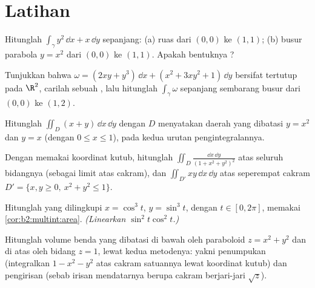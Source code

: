 \section{Latihan}

\begin{exercise}[$\star$]\label{exo:b2:multint:1}
Hitunglah $\int_\gamma y^2\,\dd x + x\,\dd y$ sepanjang: (a) ruas
dari $(0,0)$ ke $(1,1)$; (b) busur parabola $y = x^2$ dari
$(0,0)$ ke $(1,1)$. Apakah bentuknya ?
\end{exercise}

\begin{exercise}[$\star$]\label{exo:b2:multint:2}
Tunjukkan bahwa $\omega = (2xy + y^3)\,\dd x + (x^2 + 3xy^2 + 1)\,\dd y$
bersifat tertutup pada $\R^2$, carilah sebuah , lalu hitunglah
$\int_\gamma\omega$ sepanjang sembarang busur dari $(0, 0)$ ke $(1, 2)$.
\end{exercise}

\begin{exercise}[$\star$]\label{exo:b2:multint:3}
Hitunglah $\iint_D (x + y)\,\dd x\,\dd y$ dengan $D$ menyatakan daerah
yang dibatasi $y = x^2$ dan $y = x$ (dengan $0 \leq x \leq 1$), pada kedua
urutan pengintegralannya.
\end{exercise}

\begin{exercise}[$\star\star$]\label{exo:b2:multint:4}
Dengan memakai koordinat kutub, hitunglah $\iint_D \frac{\dd x\,\dd y}{(1 +
x^2 + y^2)^2}$ atas seluruh bidangnya (sebagai limit atas cakram), dan
$\iint_{D'} xy\,\dd x\,\dd y$ atas seperempat cakram $D' = \{x, y
\geq 0,\ x^2 + y^2 \leq 1\}$.
\end{exercise}

\begin{exercise}[$\star\star$]\label{exo:b2:multint:5}
Hitunglah  yang dilingkupi  $x = \cos^3 t$, $y =
\sin^3 t$, dengan $t \in [0, 2\pi]$, memakai
\cref{cor:b2:multint:area}. \emph{(Linearkan $\sin^2 t\cos^2 t$.)}
\end{exercise}

\begin{exercise}[$\star\star$]\label{exo:b2:multint:6}
Hitunglah volume benda yang dibatasi di bawah oleh paraboloid $z
= x^2 + y^2$ dan di atas oleh bidang $z = 1$, lewat kedua metodenya:
yakni penumpukan (integralkan $1 - x^2 - y^2$ atas cakram satuannya lewat
koordinat kutub) dan pengirisan (sebab irisan mendatarnya berupa cakram berjari-jari
$\sqrt z$).
\end{exercise}

